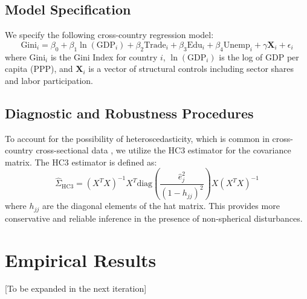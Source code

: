\documentclass[12pt,a4paper]{article}
\begin{document}
\subsection{Model Specification}
We specify the following cross-country regression model:
\begin{equation}
    \text{Gini}_i = \beta_0 + \beta_1 \ln(\text{GDP}_i) + \beta_2 \text{Trade}_i + \beta_3 \text{Edu}_i + \beta_4 \text{Unemp}_i + \gamma \mathbf{X}_i + \epsilon_i
\end{equation}
where $\text{Gini}_i$ is the Gini Index for country $i$, $\ln(\text{GDP}_i)$ is the log of GDP per capita (PPP), and $\mathbf{X}_i$ is a vector of structural controls including sector shares and labor participation.

\subsection{Diagnostic and Robustness Procedures}
To account for the possibility of heteroscedasticity, which is common in cross-country cross-sectional data \citep{white1980heteroskedasticity}, we utilize the HC3 estimator for the covariance matrix. The HC3 estimator is defined as:
\begin{equation}
    \hat{\Sigma}_{\text{HC3}} = (X^T X)^{-1} X^T \text{diag}\left(\frac{\hat{e}_j^2}{(1 - h_{jj})^2}\right) X (X^T X)^{-1}
\end{equation}
where $h_{jj}$ are the diagonal elements of the hat matrix. This provides more conservative and reliable inference in the presence of non-spherical disturbances.

\section{Empirical Results}
[To be expanded in the next iteration]



\end{document}
